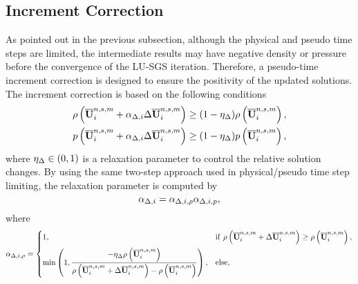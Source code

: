 \subsection{Increment Correction}
\label{ssec:increment-correction}

As pointed out in the previous subsection, although the physical and pseudo time steps are limited,
the intermediate results may have negative density or pressure before the convergence of the LU-SGS iteration.
Therefore, a pseudo-time increment correction is designed to ensure the positivity of the updated solutions.
The increment correction is based on the following conditions
\begin{equation}
    \label{eq:ppLimitInc}
    \begin{aligned}
        \rho\left(\overline{\mathbf{U}}_i^{n,s,m} + \alpha_{\mathrm\Delta,i} \mathrm\Delta \overline{\mathbf{U}}_i^{n,s,m}\right)
         & \geq
        (1- \eta_\mathrm\Delta)
        \rho\left(\overline{\mathbf{U}}_i^{n,s,m}\right), \\
        p\left(\overline{\mathbf{U}}_i^{n,s,m} + \alpha_{\mathrm\Delta,i} \mathrm\Delta \overline{\mathbf{U}}_i^{n,s,m}\right)
         & \geq
        (1- \eta_\mathrm\Delta)
        p\left(\overline{\mathbf{U}}_i^{n,s,m}\right),
    \end{aligned}
\end{equation}
where $\eta_\mathrm\Delta \in (0,1)$ is a relaxation parameter to control the relative solution changes.
By using the same two-step approach used in physical/pseudo time step limiting, the relaxation parameter is computed by
\begin{equation}
    \alpha_{\mathrm\Delta,i}= \alpha_{\mathrm\Delta,i,\rho} \alpha_{\mathrm\Delta,i,p},
\end{equation}
where
\begin{equation}
    \alpha_{\mathrm\Delta,i,\rho} = \begin{dcases}
        1,                                                                                                                                                             & \mathrm{if} \ \rho\left(\overline{\mathbf{U}}^{n,s,m}_i +\mathrm\Delta \overline{\mathbf{U}}_i^{n,s,m}\right) \geq  \rho\left(\overline{\mathbf{U}}^{n,s,m}_i\right), \\
        \min\left(1, \dfrac{-\eta_\mathrm\Delta \rho\left(\overline{\mathbf{U}}^{n,s,m}_i\right)}{\rho \left(\overline{\mathbf{U}}^{n,s,m}_i +\mathrm\Delta \overline{\mathbf{U}}_i^{n,s,m} \right)-  \rho\left(\overline{\mathbf{U}}^{n,s,m}_i\right)} \right), &
        \mathrm{else},
    \end{dcases}
\end{equation}
